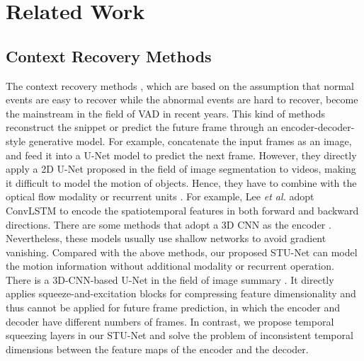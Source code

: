 \documentclass[lettersize,journal]{IEEEtran}
\begin{document}
\section{Related Work}
\subsection{Context Recovery Methods}
The context recovery methods \cite{FutureFrame2018liua, MemorizingNormality2019gonga, ClozeTest2020yu, BMANBidirectional2020lee, LearningMemoryGuided2020parka, FutureFrame2021luo, SmithNetStrictness2021nguyen, LearningNormal2021lva, HybridVideo2021liua, AppearanceMotionMemory2021caia, RobustUnsupervised2021wanga, MultiEncoderEffective2021fang, AnomalyDetection2022fang, VariationalAbnormal2022li, SelfSupervisedAttentive2022huang, InfluenceawareAttention2022zhang}, which are based on the assumption that normal events are easy to recover while the abnormal events are hard to recover, become the mainstream in the field of VAD in recent years.
This kind of methods reconstruct the snippet or predict the future frame through an encoder-decoder-style generative model.
For example, \cite{FutureFrame2018liua, FutureFrame2021luo, LearningMemoryGuided2020parka, LearningNormal2021lva, AppearanceMotionMemory2021caia, VariationalAbnormal2022li} concatenate the input frames as an image, and feed it into a U-Net model to predict the next frame.
However, they directly apply a 2D U-Net proposed in the field of image segmentation to videos, making it difficult to model the motion of objects.
Hence, they have to combine with the optical flow modality \cite{FutureFrame2018liua, FutureFrame2021luo, AppearanceMotionMemory2021caia} or recurrent units \cite{BMANBidirectional2020lee, RevisitSparse2017luoa}.
For example, Lee \textit{et al.} \cite{BMANBidirectional2020lee} adopt ConvLSTM to encode the spatiotemporal features in both forward and backward directions.
There are some methods that adopt a 3D CNN as the encoder \cite{DeepCascadeCascading2017sabokroua, AnomalyDetection2021georgescua, DeepOneClass2020wu}.
Nevertheless, these models usually use shallow networks to avoid gradient vanishing.
Compared with the above methods, our proposed STU-Net can model the motion information without additional modality or recurrent operation.
There is a 3D-CNN-based U-Net in the field of image summary \cite{VideoSummarization2022liu}.
It directly applies squeeze-and-excitation blocks \cite{SqueezeandExcitationNetworks2020hu} for compressing feature dimensionality and thus cannot be applied for future frame prediction, in which the encoder and decoder have different numbers of frames.
In contrast, we propose temporal squeezing layers in our STU-Net and solve the problem of inconsistent temporal dimensions between the feature maps of the encoder and the decoder.
\end{document}
